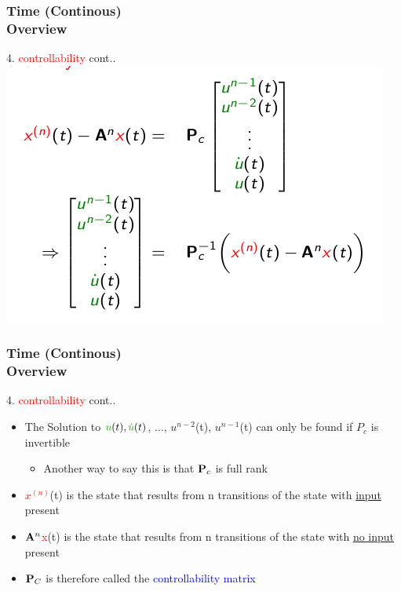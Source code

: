 \documentclass[hyperref={pdfpagelabels=true}]{beamer}
\begin{document}
\begin{frame}
\frametitle{Time (Continous) \\ {\large Overview}}
4. \textcolor{red}{controllability} {\tiny cont..}
\vfill
\centering
\includegraphics[scale = .5]{figs/Selection_049.png} 
\end{frame}


\begin{frame}
\frametitle{Time (Continous) \\ {\large Overview}}
4. \textcolor{red}{controllability} {\tiny cont..} \vfill
\begin{itemize}
\item The Solution to $\textcolor{mygreen}{u}(t), \textcolor{mygreen}{\dot{u}}(t)$, ..., \textcolor{mygreen}{$u^{n-2}$}(t), \textcolor{mygreen}{$u^{n-1}$}(t) can only be found if $P_c$ is invertible
 \begin{itemize}
 \item Another way to say this is that ${\bf P}_c$ is full rank
 \end{itemize}
\item \textcolor{red}{$x^{(n)}$}(t) is the state that results from n transitions of the state
with \underline{input} present
\item ${\bf A}^n$\textcolor{red}{x}(t) is the state that results from n transitions of the state
with \underline{no input} present
\item ${\bf P}_C$ is therefore called the \textcolor{blue}{controllability matrix}
\end{itemize}
\end{frame}
\end{document}
